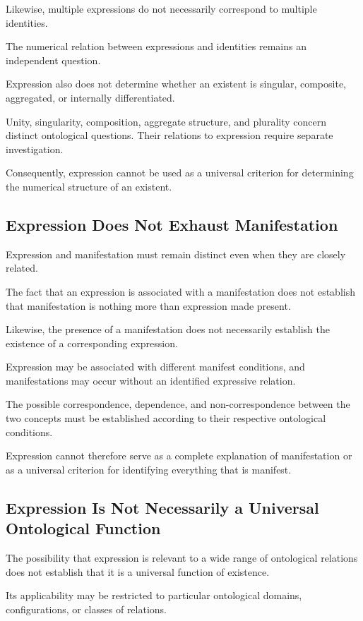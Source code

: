 Likewise, multiple expressions do not necessarily
correspond to multiple identities.

The numerical relation between expressions and
identities remains an independent question.

Expression also does not determine whether an
existent is singular, composite, aggregated, or
internally differentiated.

Unity, singularity, composition, aggregate structure,
and plurality concern distinct ontological questions.
Their relations to expression require separate
investigation.

Consequently, expression cannot be used as a
universal criterion for determining the numerical
structure of an existent.

\subsection{Expression Does Not Exhaust Manifestation}

Expression and manifestation must remain distinct
even when they are closely related.

The fact that an expression is associated with
a manifestation does not establish that manifestation
is nothing more than expression made present.

Likewise, the presence of a manifestation does not
necessarily establish the existence of a corresponding
expression.

Expression may be associated with different manifest
conditions, and manifestations may occur without
an identified expressive relation.

The possible correspondence, dependence, and
non-correspondence between the two concepts must
be established according to their respective
ontological conditions.

Expression cannot therefore serve as a complete
explanation of manifestation or as a universal
criterion for identifying everything that is manifest.

\subsection{Expression Is Not Necessarily a Universal Ontological Function}

The possibility that expression is relevant to
a wide range of ontological relations does not
establish that it is a universal function of existence.

Its applicability may be restricted to particular
ontological domains, configurations, or classes
of relations.

